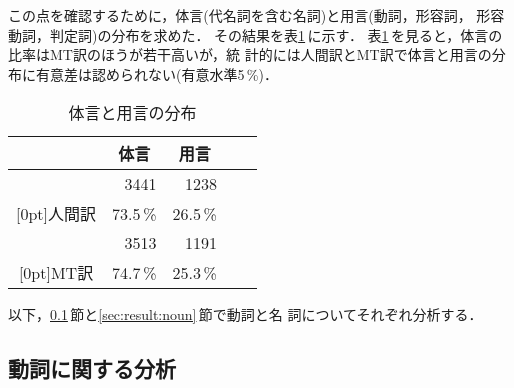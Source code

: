 この点を確認するために，体言(代名詞を含む名詞)と用言(動詞，形容詞，
形容動詞，判定詞)の分布を求めた．
その結果を表\ref{tab:pos-total}\,に示す．
表\ref{tab:pos-total}\,を見ると，体言の比率はMT訳のほうが若干高いが，統
計的には人間訳とMT訳で体言と用言の分布に有意差は認められない(有意水準5\,\%)．
\begin{table}[htbp]
\caption{体言と用言の分布}
\label{tab:pos-total}
\begin{center}
\begin{tabular}{|c||r|r|r|r|}\hline
 & \multicolumn{1}{|c}{体言} & \multicolumn{1}{|c|}{用言} \\\hline\hline 
 &   3441 & 1238 \\
\raisebox{1.5ex}[0pt]{人間訳} & 73.5\,\% & 26.5\,\% \\\hline
 &   3513 & 1191 \\
\raisebox{1.5ex}[0pt]{MT訳} & 74.7\,\% & 25.3\,\% \\\hline
\end{tabular}
\end{center}
\end{table}

以下，\ref{sec:result:verb}\,節と\ref{sec:result:noun}\,節で動詞と名
詞についてそれぞれ分析する．


\subsection{動詞に関する分析}
\label{sec:result:verb}

